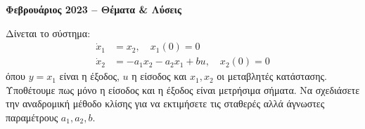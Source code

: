 \documentclass[a4paper,11pt]{article}
\begin{document}
\begin{center}
\textbf{\Large Φεβρουάριος 2023 -- Θέματα \& Λύσεις}
\end{center}

\begin{question}
Δίνεται το σύστημα:
\begin{align}
    \dot{x}_1 &= x_2, \quad x_1(0) = 0 \\
    \dot{x}_2 &= -a_1 x_2 - a_2 x_1 + b u, \quad x_2(0) = 0
\end{align}
όπου $y = x_1$ είναι η έξοδος, $u$ η είσοδος και $x_1, x_2$ οι μεταβλητές κατάστασης. Υποθέτουμε πως μόνο η είσοδος και η έξοδος είναι μετρήσιμα σήματα. Να σχεδιάσετε την αναδρομική μέθοδο κλίσης για να εκτιμήσετε τις σταθερές αλλά άγνωστες παραμέτρους $a_1, a_2, b$.
\end{question}
\end{document}
